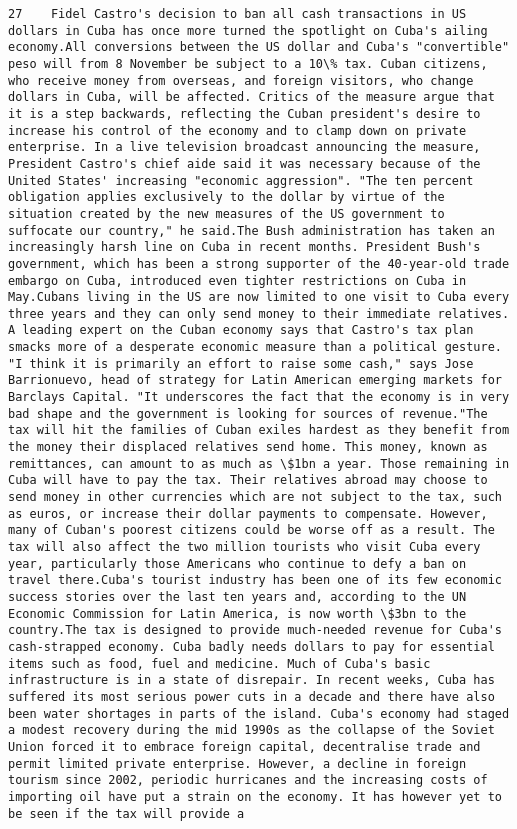 \documentclass[11pt]{article}
\begin{document}
\begin{Verbatim}[commandchars=\\\{\}]
         27    Fidel Castro's decision to ban all cash transactions in US dollars in Cuba has once more turned the spotlight on Cuba's ailing economy.All conversions between the US dollar and Cuba's "convertible" peso will from 8 November be subject to a 10\% tax. Cuban citizens, who receive money from overseas, and foreign visitors, who change dollars in Cuba, will be affected. Critics of the measure argue that it is a step backwards, reflecting the Cuban president's desire to increase his control of the economy and to clamp down on private enterprise. In a live television broadcast announcing the measure, President Castro's chief aide said it was necessary because of the United States' increasing "economic aggression". "The ten percent obligation applies exclusively to the dollar by virtue of the situation created by the new measures of the US government to suffocate our country," he said.The Bush administration has taken an increasingly harsh line on Cuba in recent months. President Bush's government, which has been a strong supporter of the 40-year-old trade embargo on Cuba, introduced even tighter restrictions on Cuba in May.Cubans living in the US are now limited to one visit to Cuba every three years and they can only send money to their immediate relatives. A leading expert on the Cuban economy says that Castro's tax plan smacks more of a desperate economic measure than a political gesture. "I think it is primarily an effort to raise some cash," says Jose Barrionuevo, head of strategy for Latin American emerging markets for Barclays Capital. "It underscores the fact that the economy is in very bad shape and the government is looking for sources of revenue."The tax will hit the families of Cuban exiles hardest as they benefit from the money their displaced relatives send home. This money, known as remittances, can amount to as much as \$1bn a year. Those remaining in Cuba will have to pay the tax. Their relatives abroad may choose to send money in other currencies which are not subject to the tax, such as euros, or increase their dollar payments to compensate. However, many of Cuban's poorest citizens could be worse off as a result. The tax will also affect the two million tourists who visit Cuba every year, particularly those Americans who continue to defy a ban on travel there.Cuba's tourist industry has been one of its few economic success stories over the last ten years and, according to the UN Economic Commission for Latin America, is now worth \$3bn to the country.The tax is designed to provide much-needed revenue for Cuba's cash-strapped economy. Cuba badly needs dollars to pay for essential items such as food, fuel and medicine. Much of Cuba's basic infrastructure is in a state of disrepair. In recent weeks, Cuba has suffered its most serious power cuts in a decade and there have also been water shortages in parts of the island. Cuba's economy had staged a modest recovery during the mid 1990s as the collapse of the Soviet Union forced it to embrace foreign capital, decentralise trade and permit limited private enterprise. However, a decline in foreign tourism since 2002, periodic hurricanes and the increasing costs of importing oil have put a strain on the economy. It has however yet to be seen if the tax will provide a 
\end{Verbatim}
\end{document}
